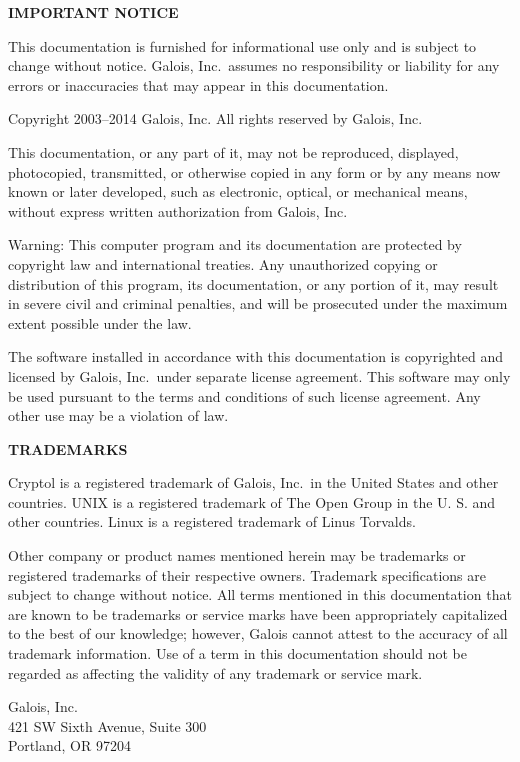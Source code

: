 \noindent
{\bf IMPORTANT NOTICE}

{\small
  This documentation is furnished for informational use only
  and is subject to change without notice. Galois, Inc.~assumes no
  responsibility or liability for any errors or inaccuracies that may
  appear in this documentation.

  Copyright 2003--2014 Galois, Inc. All rights reserved by Galois,
  Inc.

  This documentation, or any part of it, may not be reproduced,
  displayed, photocopied, transmitted, or otherwise copied in any form
  or by any means now known or later developed, such as electronic,
  optical, or mechanical means, without express written authorization
  from Galois, Inc.

  Warning: This computer program and its documentation are protected
  by copyright law and international treaties. Any unauthorized
  copying or distribution of this program, its documentation, or any
  portion of it, may result in severe civil and criminal penalties,
  and will be prosecuted under the maximum extent possible under the
  law.

  The software installed in accordance with this documentation is
  copyrighted and licensed by Galois, Inc.~under separate license
  agreement. This software may only be used pursuant to the terms and
  conditions of such license agreement.  Any other use may be a
  violation of law.}

\noindent
{\bf TRADEMARKS}

{\small 
  Cryptol is a registered trademark of Galois, Inc.~in the United
  States and other countries. UNIX is a registered trademark of The
  Open Group in the U. S.  and other countries. Linux is a registered
  trademark of Linus Torvalds.



  Other company or product names mentioned herein may be trademarks or
  registered trademarks of their respective owners. Trademark
  specifications are subject to change without notice. All terms
  mentioned in this documentation that are known to be trademarks or
  service marks have been appropriately capitalized to the best of our
  knowledge; however, Galois cannot attest to the accuracy of all
  trademark information. Use of a term in this documentation should
  not be regarded as affecting the validity of any trademark or
  service mark.

\vspace{0.5in}
\noindent
Galois, Inc.\\
421 SW Sixth Avenue, Suite 300 \\
Portland, OR 97204
}


